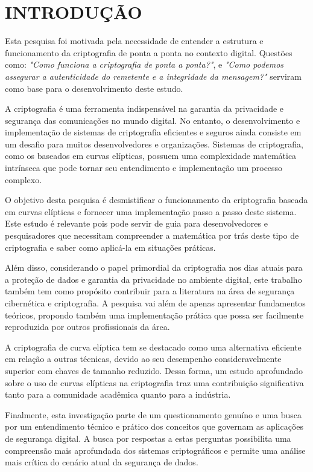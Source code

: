 \section{INTRODUÇÃO}

Esta pesquisa foi motivada pela necessidade de entender a estrutura e
funcionamento da criptografia de ponta a ponta no contexto digital. Questões
como: \textit{"Como funciona a criptografia de ponta a ponta?"}, e
\textit{"Como podemos assegurar a autenticidade do remetente e a integridade da
	mensagem?"} serviram como base para o desenvolvimento deste estudo.

A criptografia é uma ferramenta indispensável na garantia da privacidade e
segurança das comunicações no mundo digital. No entanto, o desenvolvimento e
implementação de sistemas de criptografia eficientes e seguros ainda consiste
em um desafio para muitos desenvolvedores e organizações. Sistemas de
criptografia, como os baseados em curvas elípticas, possuem uma complexidade
matemática intrínseca que pode tornar seu entendimento e implementação um
processo complexo.

O objetivo desta pesquisa é desmistificar o funcionamento da criptografia
baseada em curvas elípticas e fornecer uma implementação passo a passo deste
sistema. Este estudo é relevante pois pode servir de guia para desenvolvedores
e pesquisadores que necessitam compreender a matemática por trás deste tipo de
criptografia e saber como aplicá-la em situações práticas.

Além disso, considerando o papel primordial da criptografia nos dias atuais
para a proteção de dados e garantia da privacidade no ambiente digital, este
trabalho também tem como propósito contribuir para a literatura na área de
segurança cibernética e criptografia. A pesquisa vai além de apenas apresentar
fundamentos teóricos, propondo também uma implementação prática que possa ser
facilmente reproduzida por outros profissionais da área.

A criptografia de curva elíptica tem se destacado como uma alternativa
eficiente em relação a outras técnicas, devido ao seu desempenho
consideravelmente superior com chaves de tamanho reduzido. Dessa forma, um
estudo aprofundado sobre o uso de curvas elípticas na criptografia traz uma
contribuição significativa tanto para a comunidade acadêmica quanto para a
indústria.

Finalmente, esta investigação parte de um questionamento genuíno e uma busca
por um entendimento técnico e prático dos conceitos que governam as aplicações
de segurança digital. A busca por respostas a estas perguntas possibilita uma
compreensão mais aprofundada dos sistemas criptográficos e permite uma análise
mais crítica do cenário atual da segurança de dados.